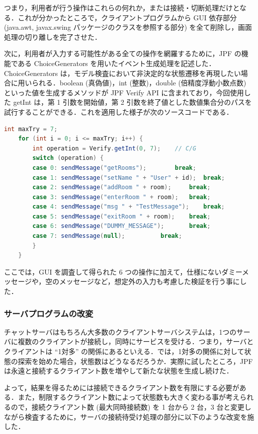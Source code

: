 \documentclass[a4j,12pt]{jarticle}
\begin{document}
つまり，利用者が行う操作はこれらの何れか，または接続・切断処理だけとなる．これが分かったところで，クライアントプログラムから GUI 依存部分 (java.awt, javax.swing パッケージのクラスを参照する部分) を全て削除し，画面処理の切り離しを完了させた．

次に，利用者が入力する可能性がある全ての操作を網羅するために，JPF の機能である ChoiceGenerators を用いたイベント生成処理を記述した．ChoiceGenerators は，モデル検査において非決定的な状態遷移を再現したい場合に用いられる．boolean (真偽値)，int (整数)，double (倍精度浮動小数点数) といった値を生成するメソッドが JPF Verify API に含まれており，今回使用した getInt は，第 1 引数を開始値，第 2 引数を終了値とした数値集合分のパスを試行することができる．これを適用した様子が次のソースコードである．

\begin{lstlisting}[label=src:event-gen, caption=クライアントプログラムのイベント生成処理,language=Java]
    int maxTry = 7;
    for (int i = 0; i <= maxTry; i++) {
        int operation = Verify.getInt(0, 7);    // C/G
        switch (operation) {
        case 0:	sendMessage("getRooms");		break;
        case 1:	sendMessage("setName " + "User" + id);	break;
        case 2:	sendMessage("addRoom " + room);		break;
        case 3:	sendMessage("enterRoom " + room);	break;
        case 4:	sendMessage("msg " + "TestMessage");	break;
        case 5:	sendMessage("exitRoom " + room);	break;
        case 6:	sendMessage("DUMMY_MESSAGE");		break;
        case 7: sendMessage(null);			break;
        }
    }
\end{lstlisting}

ここでは，GUI を調査して得られた 6 つの操作に加えて，仕様にないダミーメッセージや，空のメッセージなど，想定外の入力も考慮した検証を行う事にした．

\subsubsection{サーバプログラムの改変}

チャットサーバはもちろん大多数のクライアントサーバシステムは，1つのサーバに複数のクライアントが接続し，同時にサービスを受ける．つまり，サーバとクライアントは ``1対多'' の関係にあるといえる．では，1対多の関係に対して状態の探索を始めた場合，状態数はどうなるだろうか．実際に試したところ，JPF は永遠と接続するクライアント数を増やして新たな状態を生成し続けた．

よって，結果を得るためには接続できるクライアント数を有限にする必要がある．また，制限するクライアント数によって状態数も大きく変わる事が考えられるので，接続クライアント数 (最大同時接続数) を 1 台から 2 台，3 台と変更しながら検査するために，サーバの接続待受け処理の部分に以下のような改変を施した．
\end{document}
